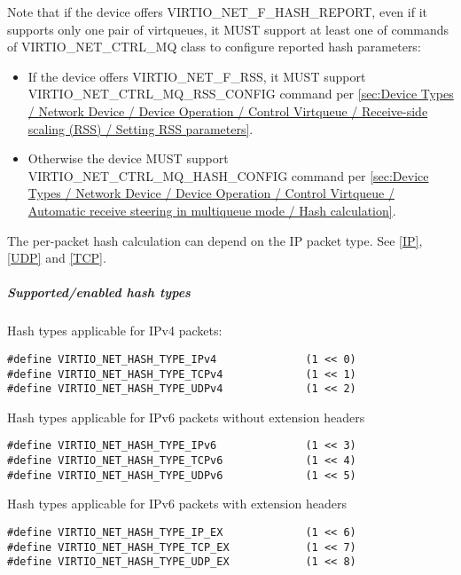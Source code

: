 Note that if the device offers VIRTIO_NET_F_HASH_REPORT, even if it supports only one pair of virtqueues, it MUST support
at least one of commands of VIRTIO_NET_CTRL_MQ class to configure reported hash parameters:
\begin{itemize}
\item If the device offers VIRTIO_NET_F_RSS, it MUST support VIRTIO_NET_CTRL_MQ_RSS_CONFIG command per
 \ref{sec:Device Types / Network Device / Device Operation / Control Virtqueue / Receive-side scaling (RSS) / Setting RSS parameters}.
\item Otherwise the device MUST support VIRTIO_NET_CTRL_MQ_HASH_CONFIG command per
 \ref{sec:Device Types / Network Device / Device Operation / Control Virtqueue / Automatic receive steering in multiqueue mode / Hash calculation}.
\end{itemize}

The per-packet hash calculation can depend on the IP packet type. See
\hyperref[intro:IP]{[IP]}, \hyperref[intro:UDP]{[UDP]} and \hyperref[intro:TCP]{[TCP]}.

\subparagraph{Supported/enabled hash types}
\label{sec:Device Types / Network Device / Device Operation / Processing of Incoming Packets / Hash calculation for incoming packets / Supported/enabled hash types}
Hash types applicable for IPv4 packets:
\begin{lstlisting}
#define VIRTIO_NET_HASH_TYPE_IPv4              (1 << 0)
#define VIRTIO_NET_HASH_TYPE_TCPv4             (1 << 1)
#define VIRTIO_NET_HASH_TYPE_UDPv4             (1 << 2)
\end{lstlisting}
Hash types applicable for IPv6 packets without extension headers
\begin{lstlisting}
#define VIRTIO_NET_HASH_TYPE_IPv6              (1 << 3)
#define VIRTIO_NET_HASH_TYPE_TCPv6             (1 << 4)
#define VIRTIO_NET_HASH_TYPE_UDPv6             (1 << 5)
\end{lstlisting}
Hash types applicable for IPv6 packets with extension headers
\begin{lstlisting}
#define VIRTIO_NET_HASH_TYPE_IP_EX             (1 << 6)
#define VIRTIO_NET_HASH_TYPE_TCP_EX            (1 << 7)
#define VIRTIO_NET_HASH_TYPE_UDP_EX            (1 << 8)
\end{lstlisting}

